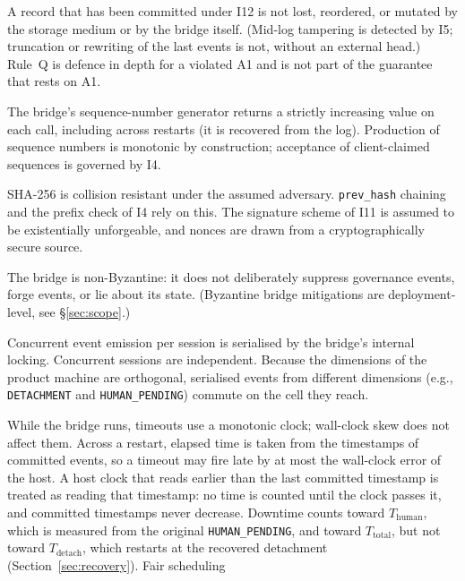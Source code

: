 \begin{description}[leftmargin=2em]
\item[A1 --- Reliable storage.] A record that has been committed under
I12 is not lost, reordered, or mutated by the storage medium or by the
bridge itself. (Mid-log tampering is detected by I5; truncation or
rewriting of the last events is not, without an external head.)
Rule~Q is defence in depth for a violated A1 and is not part of the
guarantee that rests on A1.
\item[A2 --- Monotonic sequence by construction.] The bridge's
sequence-number generator returns a strictly increasing value
on each call, including across restarts (it is recovered from the
log). Production of sequence numbers is monotonic by construction;
acceptance of client-claimed sequences is governed by I4.
\item[A3 --- SHA-256 collision resistance.] SHA-256 is collision
resistant under the assumed adversary. \texttt{prev\_hash} chaining
and the prefix check of I4 rely on this. The signature scheme of I11 is
assumed to be existentially unforgeable, and nonces are drawn from a
cryptographically secure source.
\item[A4 --- Trusted bridge.] The bridge is non-Byzantine: it does not
deliberately suppress governance events, forge events,
or lie about its state. (Byzantine bridge mitigations
are deployment-level, see \S\ref{sec:scope}.)
\item[A5 --- Serialised event emission per session.] Concurrent
event emission per session is serialised by the bridge's internal
locking. Concurrent sessions are independent. Because the dimensions of
the product machine are orthogonal, serialised events from different
dimensions (e.g., \texttt{DETACHMENT} and \texttt{HUMAN\_PENDING})
commute on the cell they reach.
\item[A6 --- Clocks.] While the bridge runs, timeouts use a monotonic
clock; wall-clock skew does not affect them. Across a restart, elapsed
time is taken from the timestamps of committed events, so a timeout may
fire late by at most the wall-clock error of the host. A host clock that
reads earlier than the last committed timestamp is treated as reading
that timestamp: no time is counted until the clock passes it, and
committed timestamps never decrease. Downtime counts toward
$T_{\text{human}}$, which is measured from the original
\texttt{HUMAN\_PENDING}, and toward $T_{\text{total}}$, but not toward
$T_{\text{detach}}$, which restarts at the recovered detachment
(Section~\ref{sec:recovery}). Fair scheduling

\end{description}
